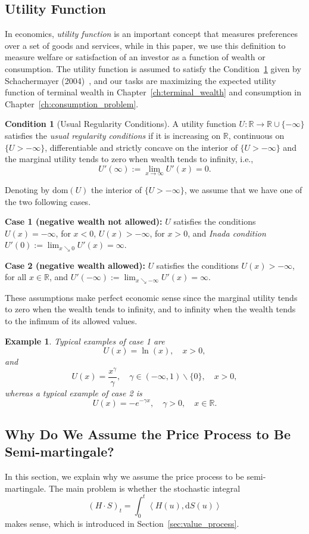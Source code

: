 \documentclass[a4paper]{article}
\newtheorem{exa}{Example}[section]
\theoremstyle{definition}
\newtheorem{condition}[theorem]{Condition}
\numberwithin{equation}{section}
\begin{document}
\subsection{Utility Function}
In economics, \emph{utility function} is an important concept that measures preferences over a set of goods and services, while in this paper, we use this definition to measure welfare or satisfaction of an investor as a function of wealth or consumption. The utility function is assumed to satisfy the Condition~\ref{cond:usual_conditions_u} given by Schachermayer (2004)~\cite{book paper}, and our tasks are maximizing the expected utility function of terminal wealth in Chapter~\ref{ch:terminal_wealth} and consumption in Chapter~\ref{ch:consumption_problem}.
\begin{condition}[Usual Regularity Conditions]\label{cond:usual_conditions_u}
A utility function $U:\mathbb R\rightarrow\mathbb R\cup\{-\infty\}$ satisfies the \emph{usual regularity conditions} if it is increasing on $\mathbb R$, continuous on $\{U>-\infty\}$, differentiable and strictly concave on the interior of $\{U>-\infty\}$ and the marginal utility tends to zero when wealth tends to infinity, i.e.,
$$U'(\infty):=\lim_{x\rightarrow\infty}U'(x)=0.$$

Denoting by $\text{dom}(U)$ the interior of $\{U>-\infty\}$, we assume that we have one of the two following cases.

\textbf{Case 1 (negative wealth not allowed):} $U$ satisfies the conditions $U(x)=-\infty$, for $x<0$, $U(x)>-\infty$, for $x>0$, and \emph{Inada condition} $U'(0):=\lim_{x\searrow 0}U'(x)=\infty$.

\textbf{Case 2 (negative wealth allowed):} $U$ satisfies the conditions $U(x)>-\infty$, for all $x\in\mathbb R$, and $U'(-\infty):=\lim_{x\searrow-\infty}U'(x)=\infty$.
\end{condition}
These assumptions make perfect economic sense since the marginal utility tends to zero when the wealth tends to infinity, and to infinity when the wealth tends to the infimum of its allowed values.
\begin{exa}
Typical examples of case 1 are
$$U(x)=\ln(x),\quad x>0,$$
and
$$U(x)=\frac{x^\gamma}{\gamma},\quad \gamma\in(-\infty,1)\backslash\{0\},\quad x>0,$$
whereas a typical example of case 2 is
$$U(x)=-e^{-\gamma x},\quad \gamma>0,\quad x\in\mathbb R.$$
\end{exa}

\subsection{Why Do We Assume the Price Process to Be Semi-martingale?}\label{sec:why_semimartingale}
In this section, we explain why we assume the price process to be semi-martingale. The main problem is whether the stochastic integral
$$(H\cdot S)_t=\int^t_0\left<H(u),\mathrm dS(u)\right>$$
makes sense, which is introduced in Section~\ref{sec:value_process}.
\end{document}
